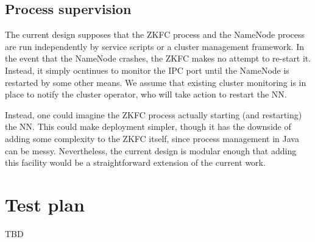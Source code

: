 \documentclass{article}
\begin{document}
\subsection{Process supervision}
The current design supposes that the ZKFC process and the NameNode process are run independently by service scripts or a cluster management framework. In the event that the NameNode crashes, the ZKFC makes no attempt to re-start it. Instead, it simply ocntinues to monitor the IPC port until the NameNode is restarted by some other means. We assume that existing cluster monitoring is in place to notify the cluster operator, who will take action to restart the NN.

Instead, one could imagine the ZKFC process actually starting (and restarting) the NN. This could make deployment simpler, though it has the downside of adding some complexity to the ZKFC itself, since process management in Java can be messy. Nevertheless, the current design is modular enough that adding this facility would be a  straightforward extension of the current work.

\section{Test plan}

TBD
\end{document}
